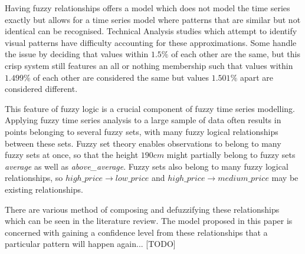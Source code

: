 \documentclass{article}
\theoremstyle{definition}
\begin{document}
Having fuzzy relationships offers a model which does not model the time series exactly but allows for a time series model where patterns that are similar but not identical can be recognised. Technical Analysis studies which attempt to identify visual patterns have difficulty accounting for these approximations. Some handle the issue by deciding that values within $1.5\%$ of each other are the same, but this crisp system still features an all or nothing membership such that values within $1.499\%$ of each other are considered the same but values $1.501\%$ apart are considered different.

This feature of fuzzy logic is a crucial component of fuzzy time series modelling. Applying fuzzy time series analysis to a large sample of data often results in points belonging to several fuzzy sets, with many fuzzy logical relationships between these sets. Fuzzy set theory enables observations to belong to many fuzzy sets at once, so that the height $190cm$ might partially belong to fuzzy sets \textit{average} as well as \textit{above\_average}. Fuzzy sets also belong to many fuzzy logical relationships, so $high\_price \rightarrow low\_price$ and $high\_price \rightarrow medium\_price$ may be existing relationships. 

There are various method of composing and defuzzifying these relationships which can be seen in the literature review. The model proposed in this paper is concerned with gaining a confidence level from these relationships that a particular pattern will happen again... [TODO]




\end{document}
